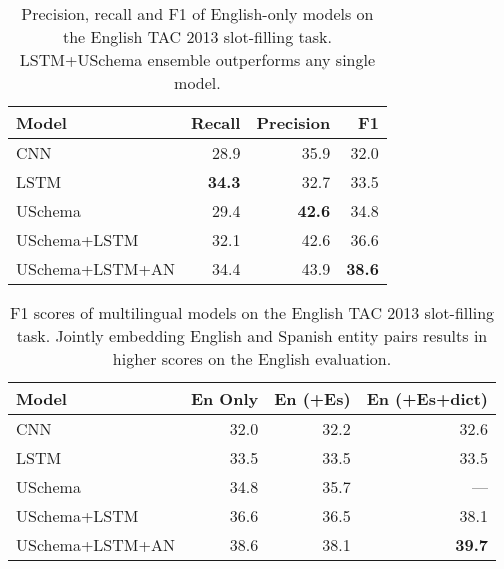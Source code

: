 \begin{table}[tb]
\begin{center}
\caption{Precision, recall and F1 of English-only models on the English TAC 2013 slot-filling task. LSTM+USchema ensemble outperforms any single model. \label{en-tac-table}}
\begin{tabular}{|lrrr|}
\hline
\bf Model & \bf Recall & \bf Precision & \bf F1 \\
\hline\hline
CNN                 & 28.9 & 35.9 & 32.0 \\
LSTM                & \bf 34.3 & 32.7 & 33.5  \\
USchema             & 29.4 & \bf 42.6 & 34.8 \\
\hline
USchema+LSTM        & 32.1 & 42.6 & 36.6 \\
USchema+LSTM+AN	& 34.4 & 43.9 & \bf 38.6 \\
\hline
\end{tabular}
\end{center}
\end{table}

\begin{table}[tb]
\vspace{-.5cm}
\begin{center}
\caption{F1 scores of multilingual models on the English TAC 2013 slot-filling task. Jointly embedding English and Spanish entity pairs results in higher scores on the English evaluation. \label{en-es-tac-table}}

\begin{tabular}{|lrrr|}
\hline
\bf Model & \bf En Only & \bf En (+Es) & \bf En (+Es+dict)  \\
\hline\hline
CNN  & 32.0 & 32.2 & 32.6	 \\
LSTM & 33.5 & 33.5 & 33.5 \\
USchema & 34.8 & 35.7  & --- \\
\hline
USchema+LSTM & 36.6 & 36.5 & 38.1 \\
USchema+LSTM+AN & 38.6 & 38.1  & \bf 39.7 \\
\hline
\end{tabular}
\end{center}
\vspace{-.15cm}

\end{table}

